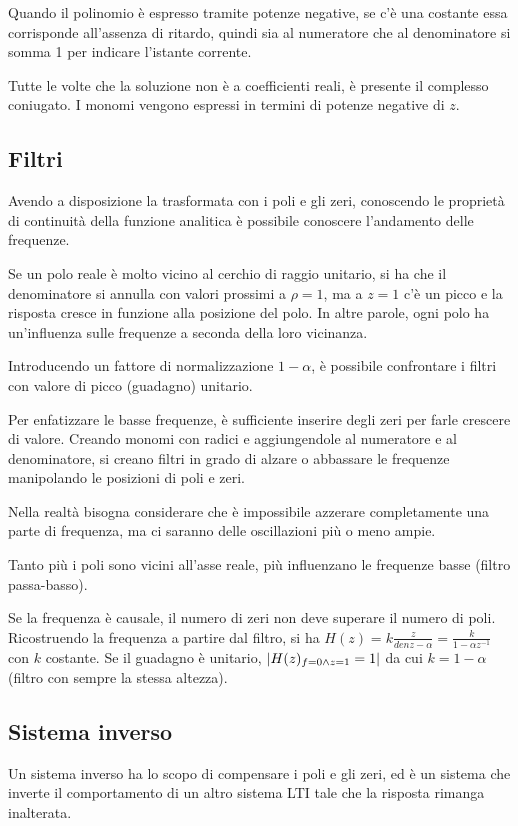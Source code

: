 Quando il polinomio è espresso tramite potenze negative, se c'è una costante essa corrisponde all'assenza di ritardo, quindi sia al numeratore che al denominatore si somma 1 per indicare l'istante corrente. 

Tutte le volte che la soluzione non è a coefficienti reali, è presente il complesso coniugato. I monomi vengono espressi in termini di potenze negative di $z$.

\subsection{Filtri}
Avendo a disposizione la trasformata con i poli e gli zeri, conoscendo le proprietà di continuità della funzione analitica è possibile conoscere l'andamento delle frequenze.

Se un polo reale è molto vicino al cerchio di raggio unitario, si ha che il denominatore si annulla con valori prossimi a $\rho = 1$, ma a $z = 1$ c'è un picco e la risposta cresce in funzione alla posizione del polo. In altre parole, ogni polo ha un'influenza sulle frequenze a seconda della loro vicinanza.
 
Introducendo un fattore di normalizzazione $1 - \alpha$, è possibile confrontare i filtri con valore di picco (guadagno) unitario.

Per enfatizzare le basse frequenze, è sufficiente inserire degli zeri per farle crescere di valore. Creando monomi con radici e aggiungendole al numeratore e al denominatore, si creano filtri in grado di alzare o abbassare le frequenze manipolando le posizioni di poli e zeri.

Nella realtà bisogna considerare che è impossibile azzerare completamente una parte di frequenza, ma ci saranno delle oscillazioni più o meno ampie.

Tanto più i poli sono vicini all'asse reale, più influenzano le frequenze basse (filtro passa-basso).

Se la frequenza è causale, il numero di zeri non deve superare il numero di poli.
Ricostruendo la frequenza a partire dal filtro, si ha $H(z) = k \frac{z}{denz - \alpha} = \frac{k}{1 - \alpha z^{-1}}$ con $k$ costante. Se il guadagno è unitario, $\left|H(z)_{f=0 \land z=1} = 1\right|$ da cui $k = 1 - \alpha$ (filtro con sempre la stessa altezza).

\subsection{Sistema inverso}
Un sistema inverso ha lo scopo di compensare i poli e gli zeri, ed è un sistema che inverte il comportamento di un altro sistema LTI tale che la risposta rimanga inalterata.

